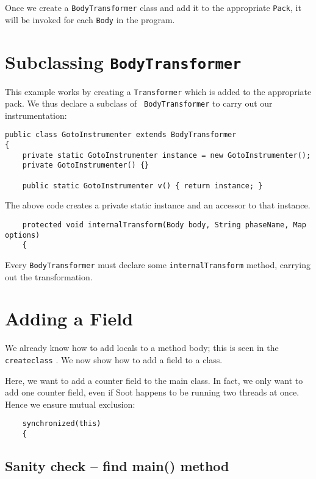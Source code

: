 \documentclass{article}
\begin{document}
Once we create a {\tt BodyTransformer} class and add it to the appropriate
{\tt Pack}, it will be invoked for each {\tt Body} in the program.

\section{Subclassing {\tt BodyTransformer}}

This example works by creating a {\tt Transformer} which is added to
the appropriate pack.  We thus declare a subclass of {\tt
BodyTransformer} to carry out our instrumentation:

\begin{verbatim}
public class GotoInstrumenter extends BodyTransformer
{
    private static GotoInstrumenter instance = new GotoInstrumenter();
    private GotoInstrumenter() {}

    public static GotoInstrumenter v() { return instance; }
\end{verbatim}

The above code creates a private static instance and an accessor to that
instance.

\begin{verbatim}
    protected void internalTransform(Body body, String phaseName, Map options)
    {
\end{verbatim}

Every {\tt BodyTransformer} must declare some {\tt internalTransform}
method, carrying out the transformation.

\section{Adding a Field}

We already know how to add locals to a method body; this is seen in
the {\tt createclass}
.
We now show how to add a field to a class.

Here, we want to add a counter field to the main class.  In fact, we
only want to add one counter field, even if Soot happens to be running
two threads at once.  Hence we ensure mutual exclusion:

\begin{verbatim}
    synchronized(this)
    {
\end{verbatim}

\subsection{Sanity check -- find main() method}
\end{document}
